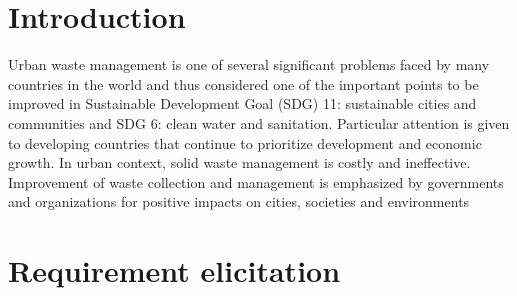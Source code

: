 \documentclass[a4paper]{article}
\begin{document}

\newpage
\tableofcontents
\newpage



\section{Introduction}
Urban waste management is one of several significant problems faced by many countries in the 
world and thus considered one of the important points to be improved in Sustainable Development 
Goal (SDG) 11: sustainable cities and communities and SDG 6: clean water and sanitation. Particular 
attention is given to developing countries that continue to prioritize development and economic 
growth. In urban context, solid waste management is costly and ineffective. Improvement of waste 
collection and management is emphasized by governments and organizations for positive impacts on 
cities, societies and environments
\section{Requirement elicitation}
\end{document}
